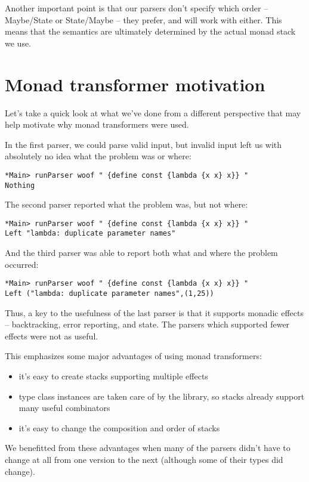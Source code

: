 \documentclass{tmr}
\begin{document}
Another important point is that our parsers don't specify
which order -- Maybe/State or State/Maybe -- they prefer, and will 
work with either.  This means that the semantics are ultimately determined by 
the actual monad stack we use.




\section{Monad transformer motivation}
Let's take a quick look at what we've done from a different perspective that
may help motivate why monad transformers were used.

In the first parser, we could parse valid input, but invalid input left us with
absolutely no idea what the problem was or where:
\begin{verbatim}
*Main> runParser woof " {define const {lambda {x x} x}} "
Nothing
\end{verbatim}

The second parser reported what the problem was, but not where:
\begin{verbatim}
*Main> runParser woof " {define const {lambda {x x} x}} "
Left "lambda: duplicate parameter names"
\end{verbatim}

And the third parser was able to report both what and where the problem occurred:
\begin{verbatim}
*Main> runParser woof " {define const {lambda {x x} x}} "
Left ("lambda: duplicate parameter names",(1,25))
\end{verbatim}

Thus, a key to the usefulness of the last parser is that it supports monadic
effects -- backtracking, error reporting, and state.  The parsers which supported 
fewer effects were not as useful.

This emphasizes some major advantages of using monad transformers:
\begin{itemize}
 \item it's easy to create stacks supporting multiple effects
 \item type class instances are taken care of by the library, so stacks already
       support many useful combinators
 \item it's easy to change the composition and order of stacks
\end{itemize}

We benefitted from these advantages when many of the parsers didn't have to change 
at all from one version to the next (although some of their types did change).
\end{document}
